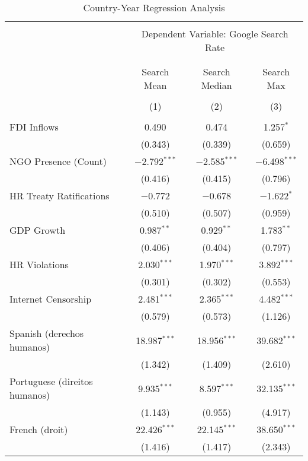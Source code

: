 
\begin{table}[!htbp] \centering 
  \caption{Country-Year Regression Analysis} 
  \label{} 
\begin{tabular}{@{\extracolsep{5pt}}lccc} 
\\[-1.8ex]\hline 
\hline \\[-1.8ex] 
 & \multicolumn{3}{c}{Dependent Variable: Google Search Rate} \\ 
\cline{2-4} 
\\[-1.8ex] & \multicolumn{3}{c}{ } \\ 
 & Search Mean & Search Median & Search Max \\ 
\\[-1.8ex] & (1) & (2) & (3)\\ 
\hline \\[-1.8ex] 
 FDI Inflows & 0.490 & 0.474 & 1.257$^{*}$ \\ 
  & (0.343) & (0.339) & (0.659) \\ 
  NGO Presence (Count) & $-$2.792$^{***}$ & $-$2.585$^{***}$ & $-$6.498$^{***}$ \\ 
  & (0.416) & (0.415) & (0.796) \\ 
  HR Treaty Ratifications & $-$0.772 & $-$0.678 & $-$1.622$^{*}$ \\ 
  & (0.510) & (0.507) & (0.959) \\ 
  GDP Growth & 0.987$^{**}$ & 0.929$^{**}$ & 1.783$^{**}$ \\ 
  & (0.406) & (0.404) & (0.797) \\ 
  HR Violations & 2.030$^{***}$ & 1.970$^{***}$ & 3.892$^{***}$ \\ 
  & (0.301) & (0.302) & (0.553) \\ 
  Internet Censorship & 2.481$^{***}$ & 2.365$^{***}$ & 4.482$^{***}$ \\ 
  & (0.579) & (0.573) & (1.126) \\ 
  Spanish (derechos humanos) & 18.987$^{***}$ & 18.956$^{***}$ & 39.682$^{***}$ \\ 
  & (1.342) & (1.409) & (2.610) \\ 
  Portuguese (direitos humanos) & 9.935$^{***}$ & 8.597$^{***}$ & 32.135$^{***}$ \\ 
  & (1.143) & (0.955) & (4.917) \\ 
  French (droit) & 22.426$^{***}$ & 22.145$^{***}$ & 38.650$^{***}$ \\ 
  & (1.416) & (1.417) & (2.343) \\ 

\end{tabular}
\end{table}
